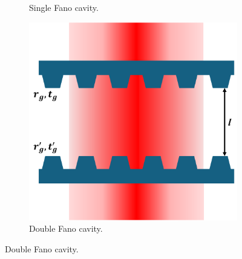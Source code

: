 \begin{figure}
\begin{subfigure}[b]{0.3\textwidth}
        \caption{Single Fano cavity.}
    \end{subfigure}
    \hfill
    \begin{subfigure}[b]{0.3\textwidth}
        \includegraphics[width=\textwidth]{figures/double_fano_sketch.pdf}
        \caption{Double Fano cavity.}
    \end{subfigure}
\end{figure}